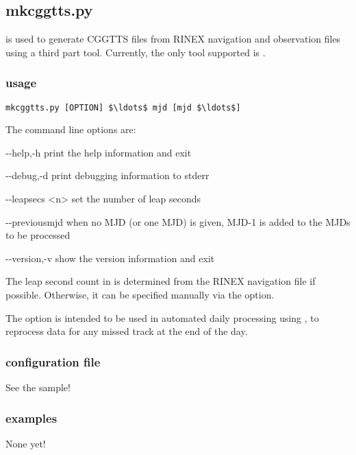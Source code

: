 \subsection{mkcggtts.py}

\hypertarget{h:mkcggtts}{}

 is used to generate CGGTTS files from RINEX navigation and observation files using
a third part tool. Currently, the only tool supported is .

\subsubsection{usage}

\begin{lstlisting}[mathescape=true]
mkcggtts.py [OPTION] $\ldots$ mjd [mjd $\ldots$]
\end{lstlisting}
The command line options are:
\begin{description*}
	\item[-{}-help,-h]	print the help information and exit
	\item[-{}-debug,-d]	print debugging information to stderr
	\item[-{}-leapsecs \textless{n}\textgreater]	set the number of leap seconds
	\item[-{}-previousmjd]	when no MJD (or one MJD) is given, MJD-1 is added to the MJDs to be processed
	\item[-{}-version,-v] show the version information and exit
\end{description*}

The leap second count in  is determined from the RINEX navigation file if possible.
Otherwise, it can be specified manually via  the  option.

The  option is intended to be used in automated daily processing using , 
to reprocess data for any missed track at the end of the day.

\subsubsection{configuration file}

See the sample!

\subsubsection{examples}

None yet!
